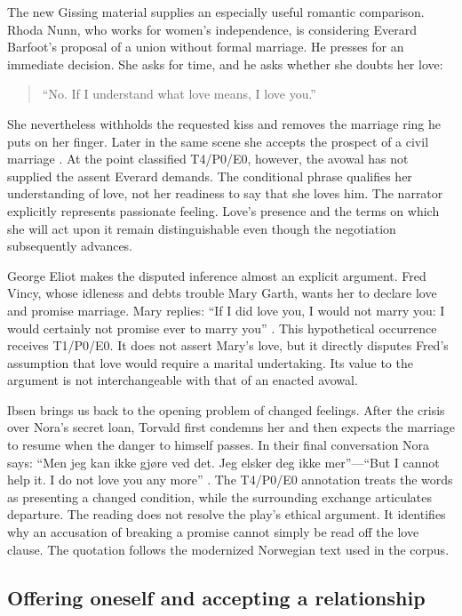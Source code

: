 \documentclass[11pt,a4paper]{article}
\begin{document}
The new Gissing material supplies an especially useful romantic comparison. Rhoda Nunn, who works for women's independence, is considering Everard Barfoot's proposal of a union without formal marriage. He presses for an immediate decision. She asks for time, and he asks whether she doubts her love:
\begin{quote}
“No. If I understand what love means, I love you.”
\end{quote}
She nevertheless withholds the requested kiss and removes the marriage ring he puts on her finger. Later in the same scene she accepts the prospect of a civil marriage \citep[chap.~XXV]{gissingOddWomen}. At the point classified T4/P0/E0, however, the avowal has not supplied the assent Everard demands. The conditional phrase qualifies her understanding of love, not her readiness to say that she loves him. The narrator explicitly represents passionate feeling. Love's presence and the terms on which she will act upon it remain distinguishable even though the negotiation subsequently advances.

George Eliot makes the disputed inference almost an explicit argument. Fred Vincy, whose idleness and debts trouble Mary Garth, wants her to declare love and promise marriage. Mary replies: “If I did love you, I would not marry you: I would certainly not promise ever to marry you” \citep[chap.~XIV]{eliotMiddlemarch}. This hypothetical occurrence receives T1/P0/E0. It does not assert Mary's love, but it directly disputes Fred's assumption that love would require a marital undertaking. Its value to the argument is not interchangeable with that of an enacted avowal.

Ibsen brings us back to the opening problem of changed feelings. After the crisis over Nora's secret loan, Torvald first condemns her and then expects the marriage to resume when the danger to himself passes. In their final conversation Nora says: “Men jeg kan ikke gjøre ved det. Jeg elsker deg ikke mer”---“But I cannot help it. I do not love you any more” \citep[act~III]{ibsenDukkehjem}. The T4/P0/E0 annotation treats the words as presenting a changed condition, while the surrounding exchange articulates departure. The reading does not resolve the play's ethical argument. It identifies why an accusation of breaking a promise cannot simply be read off the love clause. The quotation follows the modernized Norwegian text used in the corpus.

\subsection{Offering oneself and accepting a relationship}
\end{document}
